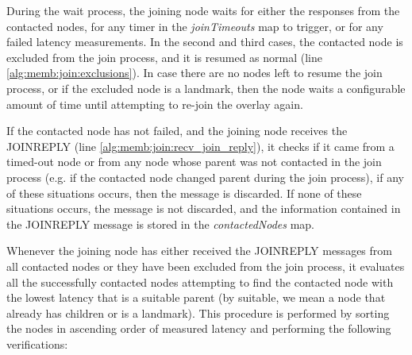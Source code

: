 During the wait process, the joining node waits for either the responses from the contacted nodes, for any timer in the \textit{joinTimeouts} map to trigger, or for any failed latency measurements. In the second and third cases, the contacted node is excluded from the join process, and it is resumed as normal (line \ref{alg:memb:join:exclusions}). In case there are no nodes left to resume the join process, or if the excluded node is a landmark, then the node waits a configurable amount of time until attempting to re-join the overlay again. 

If the contacted node has not failed, and the joining node receives the JOINREPLY (line \ref{alg:memb:join:recv_join_reply}), it checks if it came from a timed-out node or from any node whose parent was not contacted in the join process (e.g. if the contacted node changed parent during the join process), if any of these situations occurs, then the message is discarded. If none of these situations occurs, the message is not discarded, and the information contained in the JOINREPLY message is stored in the \textit{contactedNodes} map.

Whenever the joining node has either received the JOINREPLY messages from all contacted nodes or they have been excluded from the join process, it evaluates all the successfully contacted nodes attempting to find the contacted node with the lowest latency that is a suitable parent (by suitable, we mean a node that already has children or is a landmark). This procedure is performed by sorting the nodes in ascending order of measured latency and performing the following verifications:

